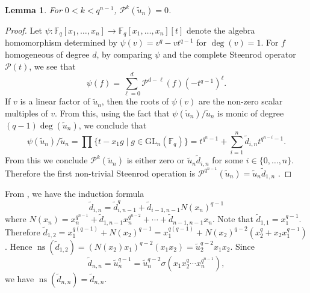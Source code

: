 \documentclass{amsart}
\newtheorem{lemma}[subsection]{Lemma}
\newcommand{\field}{\mathbb{F}}
\newcommand{\gl}[2]{{{\text{GL}_{{#1}}(\field_{#2})}}}
\newcommand{\PP}{\mathcal{P}}
\DeclareMathOperator{\ns}{ns}
\begin{document}
\begin{lemma} \label{stn_un} For $0<k<q^{n-1}$, $\PP^k(\widetilde{u}_n)=0$.
\end{lemma}
\begin{proof} Let $\psi:\field_q[x_1,\ldots,x_n]\to \field_q[x_1,\ldots,x_n][t]$ denote the algebra homomorphism determined by $\psi(v)=v^q-vt^{q-1}$ for $\deg(v)=1$.
For $f$ homogeneous of degree $d$, by comparing $\psi$ and the complete Steenrod operator $\PP(t)$, we see that
$$\psi(f)=\sum_{\ell=0}^d\PP^{d-\ell}(f)(-t^{q-1})^{\ell}.$$
If $v$ is a linear factor of $\widetilde{u}_n$, then the roots of $\psi(v)$ are the non-zero scalar multiples of $v$. 
From this, using the fact that $\psi(\widetilde{u}_n)/\widetilde{u}_n$ is monic of degree $(q-1)\deg(\widetilde{u}_n)$,
 we conclude that
$$\psi(\widetilde{u}_n)/\widetilde{u}_n=\prod\{t-x_1 g\mid g\in \gl{n}{q}\}=t^{q^n-1}+\sum_{i=1}^n \widetilde{d}_{i,n}t^{q^{n-i}-1}.$$ 
From this we conclude $\PP^k(\widetilde{u}_n)$ is either zero or $\widetilde{u}_n \widetilde{d}_{i,n}$ for some $i\in\{0,\ldots,n\}$.
Therefore the first non-trivial Steenrod operation  is $\PP^{q^{n-1}}(\widetilde{u}_n )=\widetilde{u}_n \widetilde{d}_{1,n}$ .
\end{proof}

From \cite[Prop. 1.3]{wilkerson-primdickinva:83}, 
we have the induction formula 
$$\widetilde{d}_{i,n}=\widetilde{d}_{i,n-1}^q+\widetilde{d}_{i-1,n-1}N(x_n)^{q-1}$$
where $N(x_n)=x_n^{q^{n-1}}+ \widetilde{d}_{1,n-1}x_n^{q^{n-2}}+\cdots +\widetilde{d}_{n-1,n-1}x_n$.
Note that $\widetilde{d}_{1,1}=x_1^{q-1}$. Therefore $\widetilde{d}_{1,2}=x_1^{q(q-1)}+N(x_2)^{q-1}=x_1^{q(q-1)}+N(x_2)^{q-2}(x_2^q+x_2x_1^{q-1})$.
Hence $\ns(\widetilde{d}_{1,2})=(N(x_2)x_1)^{q-2}(x_1x_2)=\widetilde{u}_2^{q-2}x_1x_2$. 
Since 
$$\widetilde{d}_{n,n}=\widetilde{u}_n^{q-1}=\widetilde{u}_n^{q-2}\sigma(x_1x_2^q\cdots x_n^{q^{n-1}}),$$ we have $\ns(\widetilde{d}_{n,n})=\widetilde{d}_{n,n}$.
\end{document}

